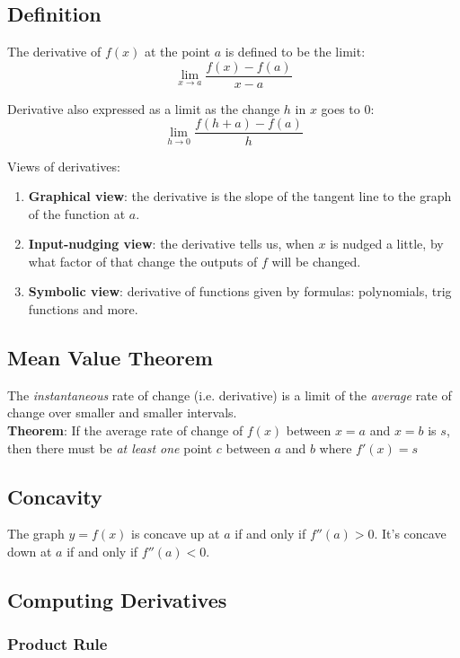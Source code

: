 \documentclass[12pt, a4paper]{scrartcl}
\begin{document}
\subsection{Definition}
\label{sec:derivatives:def}
The derivative of $f(x)$ at the point $a$ is defined to be the limit: $$\lim_{x \to a}\dfrac{f(x) - f(a)}{x - a}$$

Derivative also expressed as a limit as the change $h$ in $x$ goes to $0$: $$\lim_{h \to 0}\dfrac{f(h+a) - f(a)}{h}$$

Views of derivatives:
\begin{enumerate}
    \item \textbf{Graphical view}: the derivative is the slope of the tangent line to the graph of the function at $a$.
    \item \textbf{Input-nudging view}: the derivative tells us, when $x$ is nudged a little, by what factor of that change the outputs of $f$ will be changed.
    \item \textbf{Symbolic view}: derivative of functions given by formulas: polynomials, trig functions and more.
\end{enumerate}


\subsection{Mean Value Theorem}
\label{sec:derivatives:mvt}

The \textit{instantaneous} rate of change (i.e. derivative) is a limit of the \textit{average} rate of change over smaller and smaller intervals.\\
\textbf{Theorem}: If the average rate of change of $f(x)$ between $x = a$ and $x = b$ is $s$, then there must be \textit{at least one} point $c$ between $a$ and $b$ where $f'(x)=s$

\subsection{Concavity}
\label{sec:derivatives:concavity}

The graph $y = f(x)$ is concave up at $a$ if and only if  $f''(a) > 0$.	It's concave down at $a$ if and only if $f''(a) < 0$.

\subsection{Computing Derivatives}
\label{sec:derivatives:computing}

\subsubsection{Product Rule}
\label{sec:derivatives:computing:product}
\end{document}
